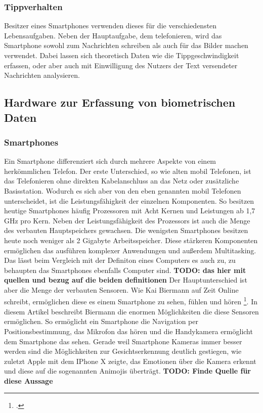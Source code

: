 \subsubsection{Tippverhalten}
Besitzer eines Smartphones verwenden dieses für die verschiedensten Lebensaufgaben. Neben der Hauptaufgabe, dem telefonieren, wird das Smartphone sowohl zum Nachrichten schreiben als auch für das Bilder machen verwendet. Dabei lassen sich theoretisch Daten wie die Tippgeschwindigkeit erfassen, oder aber auch mit Einwilligung des Nutzers der Text versendeter Nachrichten analysieren.
\subsection{Hardware zur Erfassung von biometrischen Daten}
\subsubsection{Smartphones}
Ein Smartphone differenziert sich durch mehrere Aspekte von einem herkömmlichen Telefon. Der erste Unterschied, so wie alten mobil Telefonen, ist das Telefonieren ohne direkten Kabelanschluss an das Netz oder zusätzliche Basisstation.\newline 
Wodurch es sich aber von den eben genannten mobil Telefonen unterscheidet, ist die Leistungsfähigkeit der einzelnen Komponenten. So besitzen heutige Smartphones häufig Prozessoren mit Acht Kernen und Leistungen ab 1,7 GHz pro Kern. Neben der Leistungsfähigkeit des Prozessors ist auch die Menge des verbauten Hauptspeichers gewachsen. Die wenigsten Smartphones besitzen heute noch weniger als 2 Gigabyte Arbeitsspeicher. Diese stärkeren Komponenten ermöglichen das ausführen komplexer Anwendungen und außerdem Multitasking. Das lässt beim Vergleich mit der Definiton eines Computers es auch zu, zu behaupten das Smartphones ebenfalls Computer sind. \textbf{TODO: das hier mit quellen und bezug auf die beiden definitionen}\newline
Der Hauptunterschied ist aber die Menge der verbauten Sensoren. Wie Kai Biermann auf Zeit Online schreibt, ermöglichen diese es einem Smartphone zu sehen, fühlen und hören \footcite[Vgl.][S. 1 Abs. 2]{Bie14}. In diesem Artikel beschreibt Biermann die enormen Möglichkeiten die diese Sensoren ermöglichen. So ermöglicht ein Smartphone die Navigation per Positionsbestimmung, das Mikrofon das hören und die Handykamera ermöglicht dem Smartphone das sehen. Gerade weil Smartphone Kameras immer besser werden sind die Möglichkeiten zur Gesichtserkennung deutlich gestiegen, wie zuletzt Apple mit dem IPhone X zeigte, das Emotionen über die Kamera erkennt und diese auf die sogenannten Animojis überträgt. \textbf{TODO: Finde Quelle für diese Aussage} \newline
